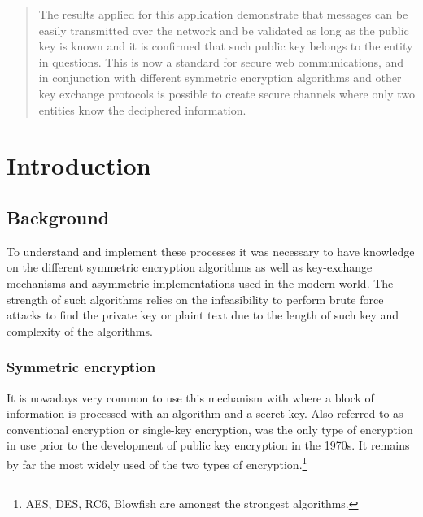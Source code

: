 \documentclass[letterpaper,12pt]{article}
\begin{document}
\begin{abstract}
\begin{enumerate}
\end{enumerate}

The results applied for this application demonstrate that messages can be easily transmitted over the network and be validated as long as the public key is known and it is confirmed that such public key belongs to the entity in questions. This is now a standard for secure web communications, and in conjunction with different symmetric encryption algorithms and other key exchange protocols is possible to create secure channels where only two entities know the deciphered information.
\end{abstract}
\newpage
\section{Introduction}
    \subsection{Background}
    To understand and implement these processes it was necessary to have knowledge on the different symmetric encryption algorithms as well as key-exchange mechanisms and asymmetric implementations used in the modern world. The strength of such algorithms relies on the infeasibility to perform brute force attacks to find the private key or plaint text due to the length of such key and complexity of the algorithms.
    \subsubsection{Symmetric encryption}
    It is nowadays very common to use this mechanism with where a block of information is processed with an algorithm and a secret key. Also referred to as conventional encryption or single-key
encryption, was the only type of encryption in use prior to the development of public key encryption in the 1970s. It remains by far the most widely used of the two types
of encryption.\footnote{AES, DES, RC6, Blowfish are amongst the strongest algorithms.}\cite{WS2017-SYMENC}
\end{document}

